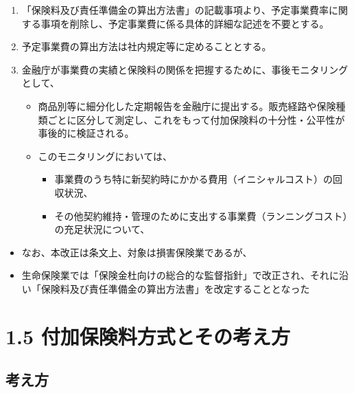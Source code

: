 \documentclass[]{article}
\begin{document}
\begin{enumerate}
\def\labelenumi{\arabic{enumi}.}
\tightlist
\item
  「保険料及び責任準備金の算出方法書」の記載事項より、予定事業費率に関する事項を削除し、予定事業費に係る具体的詳細な記述を不要とする。
\item
  予定事業費の算出方法は社内規定等に定めることとする。
\item
  金融庁が事業費の実績と保険料の関係を把握するために、事後モニタリングとして、

  \begin{itemize}
  \tightlist
  \item
    商品別等に細分化した定期報告を金融庁に提出する。販売経路や保険種類ごとに区分して測定し、これをもって付加保険料の十分性・公平性が事後的に検証される。
  \item
    このモニタリングにおいては、

    \begin{itemize}
    \tightlist
    \item
      事業費のうち特に新契約時にかかる費用（イニシャルコスト）の回収状況、
    \item
      その他契約維持・管理のために支出する事業費（ランニングコスト）の充足状況について、
    \end{itemize}
  \end{itemize}
\end{enumerate}

\begin{itemize}
\tightlist
\item
  なお、本改正は条文上、対象は損害保険業であるが、
\item
  生命保険業では「保険金杜向けの総合的な監督指針」で改正され、それに沿い「保険料及び責任準備金の算出方法書」を改定することとなった
\end{itemize}

\hypertarget{ux4ed8ux52a0ux4fddux967aux6599ux65b9ux5f0fux3068ux305dux306eux8003ux3048ux65b9}{%
\section{1.5
付加保険料方式とその考え方}\label{ux4ed8ux52a0ux4fddux967aux6599ux65b9ux5f0fux3068ux305dux306eux8003ux3048ux65b9}}

\hypertarget{ux8003ux3048ux65b9}{%
\subsection{考え方}\label{ux8003ux3048ux65b9}}
\end{document}
